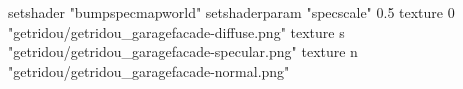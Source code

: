 setshader "bumpspecmapworld"
setshaderparam "specscale" 0.5
texture 0 "getridou/getridou_garagefacade-diffuse.png"
texture s "getridou/getridou_garagefacade-specular.png"
texture n "getridou/getridou_garagefacade-normal.png"
